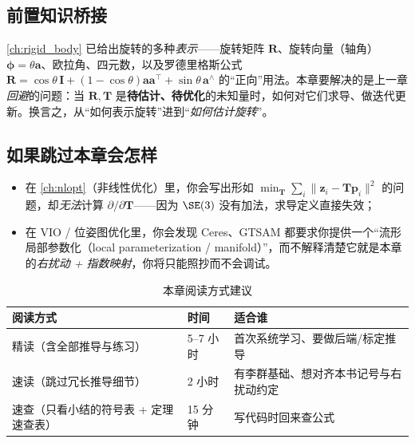 \subsection*{前置知识桥接}
\cref{ch:rigid_body} 已给出旋转的多种\emph{表示}——旋转矩阵 $\mathbf{R}$、旋转向量（轴角）$\boldsymbol{\phi}=\theta\mathbf{a}$、欧拉角、四元数，以及罗德里格斯公式 $\mathbf{R}=\cos\theta\,\mathbf{I}+(1-\cos\theta)\mathbf{a}\mathbf{a}^\top+\sin\theta\,\mathbf{a}^\wedge$ 的“正向”用法。本章要解决的是上一章\emph{回避}的问题：当 $\mathbf{R},\mathbf{T}$ 是\textbf{待估计、待优化}的未知量时，如何对它们求导、做迭代更新。换言之，从“如何表示旋转”进到“\emph{如何估计旋转}”。

\subsection*{如果跳过本章会怎样}
\begin{itemize}
  \item 在 \cref{ch:nlopt}（非线性优化）里，你会写出形如 $\min_{\mathbf{T}}\sum_i\|\mathbf{z}_i-\mathbf{T}\mathbf{p}_i\|^2$ 的问题，却\emph{无法}计算 $\partial/\partial\mathbf{T}$——因为 $\SE(3)$ 没有加法，求导定义直接失效；
  \item 在 VIO / 位姿图优化里，你会发现 Ceres、GTSAM 都要求你提供一个“流形局部参数化（local parameterization / manifold）”，而不解释清楚它就是本章的\emph{右扰动 + 指数映射}，你将只能照抄而不会调试。
\end{itemize}

\begin{table}[H]\centering\small
\caption{本章阅读方式建议}
\begin{tabular}{lll}
\toprule
阅读方式 & 时间 & 适合谁 \\
\midrule
精读（含全部推导与练习） & 5--7 小时 & 首次系统学习、要做后端/标定推导 \\
速读（跳过冗长推导细节） & 2 小时 & 有李群基础、想对齐本书记号与右扰动约定 \\
速查（只看小结的符号表 + 定理速查表） & 15 分钟 & 写代码时回来查公式 \\
\bottomrule
\end{tabular}
\end{table}

